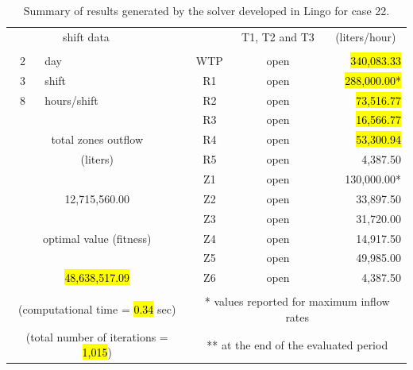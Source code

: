 \documentclass{singlecol}
\theoremstyle{TH}{
\newtheorem{lemma}{Lemma}
\newtheorem{theorem}[lemma]{Theorem}
\newtheorem{corrolary}[lemma]{Corrolary}
\newtheorem{conjecture}[lemma]{Conjecture}
\newtheorem{proposition}[lemma]{Proposition}
\newtheorem{claim}[lemma]{Claim}
\newtheorem{stheorem}[lemma]{Wrong Theorem}
\newtheorem{algorithm}{Algorithm}
}
\theoremstyle{THrm}{
\newtheorem{definition}{Definition}[section]
\newtheorem{question}{Question}[section]
\newtheorem{remark}{Remark}
\newtheorem{scheme}{Scheme}
}
\theoremstyle{THhit}{
\newtheorem{case}{Case}[section]
}
\begin{document}
\begin{table}[h!]
\begin{center}
\begin{small}
\begin{tabular}{ c r r r r r }
		\multicolumn{2}{c}{shift data}     &   &      & \multicolumn{1}{c}{T1, T2 and T3}        & \multicolumn{1}{c}{(liters/hour)}  \\
		   \\
		2   &  \multicolumn{1}{l}{day}   &              		& \multicolumn{1}{c}{WTP}    & \multicolumn{1}{c}{open} &  \hl{340,083.33} \\
		3   &  \multicolumn{1}{l}{shift}  &         			& \multicolumn{1}{c}{R1}     & \multicolumn{1}{c}{open} &  \hl{288,000.00*}  \\
		8   &  \multicolumn{1}{l}{hours/shift}        &         & \multicolumn{1}{c}{R2}     & \multicolumn{1}{c}{open} &   \hl{73,516.77}  \\
	   &      &              									& \multicolumn{1}{c}{R3}     & \multicolumn{1}{c}{open} &   \hl{16,566.77}  \\
	   \multicolumn{3}{c}{total zones outflow}                  & \multicolumn{1}{c}{R4}     & \multicolumn{1}{c}{open} &   \hl{53,300.94}  \\
	   \multicolumn{3}{c}{(liters)}              				& \multicolumn{1}{c}{R5}     & \multicolumn{1}{c}{open} &    4,387.50  \\
	   &      &              									& \multicolumn{1}{c}{Z1}     & \multicolumn{1}{c}{open} &  130,000.00* \\
	   \multicolumn{3}{c}{12,715,560.00}              			& \multicolumn{1}{c}{Z2}     & \multicolumn{1}{c}{open} &   33,897.50  \\
	      &              &              						& \multicolumn{1}{c}{Z3}     & \multicolumn{1}{c}{open} &   31,720.00  \\
	   \multicolumn{3}{c}{optimal value (fitness)}              & \multicolumn{1}{c}{Z4}     & \multicolumn{1}{c}{open} &   14,917.50  \\
	   &             &             						 		& \multicolumn{1}{c}{Z5}     & \multicolumn{1}{c}{open} &   49,985.00  \\
	   \multicolumn{3}{c}{\hl{48,638,517.09}}              			& \multicolumn{1}{c}{Z6}     & \multicolumn{1}{c}{open} &    4,387.50  \\
	   \\
	   \multicolumn{3}{c}{(computational time = \hl{0.34} sec)} & \multicolumn{3}{c}{* values reported for maximum inflow rates} \\
	   \multicolumn{3}{c}{(total number of iterations = \hl{1,015})} & \multicolumn{3}{c}{** at the end of the evaluated period} 

	\end{tabular}
\caption{Summary of results generated by the solver developed in Lingo for case 22.}
\label{tab:lingoEvaluationsCase22}
\end{small}
\end{center}
\end{table}
\end{document}

